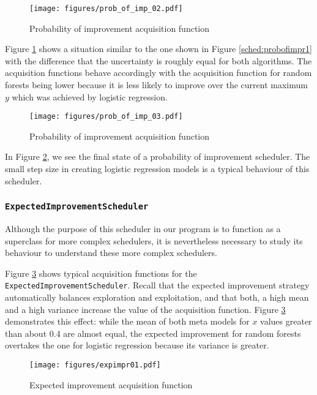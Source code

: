 \documentclass[a4paper,12pt,twoside,openright]{report}
\begin{document}
\begin{figure}
\centering

  \texttt{[image: figures/prob\_of\_imp\_02.pdf]}
  \caption{Probability of improvement acquisition function}
  \label{sched:probofimpr2}
\end{figure}

Figure \ref{sched:probofimpr2} shows a situation similar to the one shown in Figure \ref{sched:probofimpr1} with the difference that the uncertainty is roughly equal for both algorithms. The acquisition functions behave accordingly with the acquisition function for random forests being lower because it is less likely to improve over the current maximum $y$ which was achieved by logistic regression.

\begin{figure}
\centering
  \texttt{[image: figures/prob\_of\_imp\_03.pdf]}
  \caption{Probability of improvement acquisition function}
  \label{sched:probofimpr3}
\end{figure}

In Figure \ref{sched:probofimpr3}, we see the final state of a probability of improvement scheduler. The small step size in creating logistic regression models is a typical behaviour of this scheduler. 

\subsubsection{\texttt{ExpectedImprovementScheduler}}

Although the purpose of this scheduler in our program is to function as a superclass for more complex schedulers, it is nevertheless necessary to study its behaviour to understand these more complex schedulers.


Figure \ref{sched:expimpr01} shows typical acquisition functions for the \texttt{ExpectedImprovementScheduler}. Recall that the expected improvement strategy automatically balances exploration and exploitation, and that both, a high mean and a high variance increase the value of the acquisition function. Figure \ref{sched:expimpr01} demonstrates this effect: while the mean of both meta models for $x$ values greater than about 0.4 are almost equal, the expected improvement for random forests overtakes the one for logistic regression because its variance is greater.

\begin{figure}
\centering
  \texttt{[image: figures/expimpr01.pdf]}
  \caption{Expected improvement acquisition function}
  \label{sched:expimpr01}
\end{figure}
\end{document}
